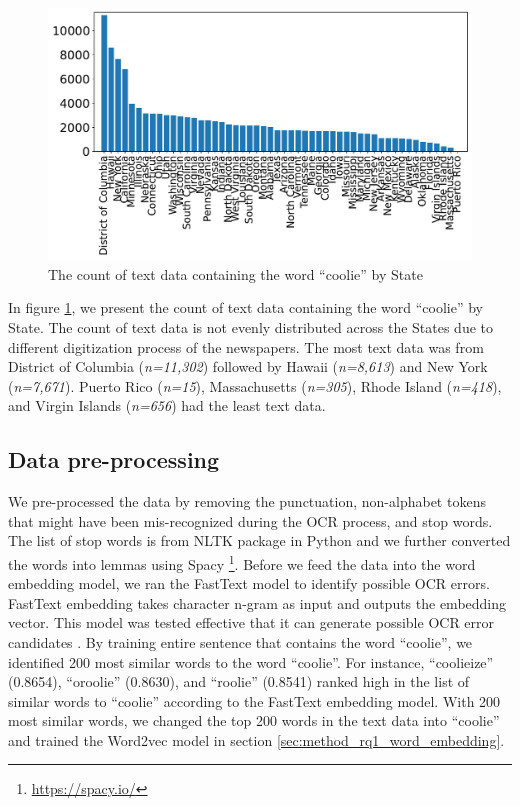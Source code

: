 \documentclass[11pt]{article}
\begin{document}
\begin{figure}[h!]
  \centering
  \includegraphics[width=\columnwidth]{descriptive.pdf}
  \caption{The count of text data containing the word ``coolie'' by State}
  \label{fig:descriptive}
\end{figure}

In figure \ref{fig:descriptive}, we present the count of text data containing the word ``coolie'' by State.
The count of text data is not evenly distributed across the States due to different digitization process of the newspapers.
The most text data was from District of Columbia (\textit{n=11,302}) followed by Hawaii (\textit{n=8,613}) and New York (\textit{n=7,671}).
Puerto Rico (\textit{n=15}), Massachusetts (\textit{n=305}), Rhode Island (\textit{n=418}), and Virgin Islands (\textit{n=656}) 
had the least text data.

\subsection{Data pre-processing} \label{sec:data_preprocessing}
We pre-processed the data by removing the punctuation, non-alphabet tokens that might have been mis-recognized
during the OCR process, and stop words. The list of stop words is from NLTK package in Python and 
we further converted the words into lemmas using Spacy \footnote{\url{https://spacy.io/}}.
Before we feed the data into the word embedding model, we ran the FastText model \cite{bojanowski_enriching_2017} 
to identify possible OCR errors. FastText embedding takes character n-gram as input and outputs the embedding vector. 
This model was tested effective that it can generate possible OCR error candidates \citep{hajiali_generating_2022}. 
By training entire sentence that contains the word ``coolie'', we identified 200 most similar words to the word ``coolie''. 
For instance, ``coolieize'' (0.8654), ``oroolie'' (0.8630), and ``roolie'' (0.8541) ranked high in the list of similar words to ``coolie''
according to the FastText embedding model.
With 200 most similar words, we changed the top 200 words in the text data into ``coolie'' and trained the Word2vec model
in section \ref{sec:method_rq1_word_embedding}. 
\end{document}
